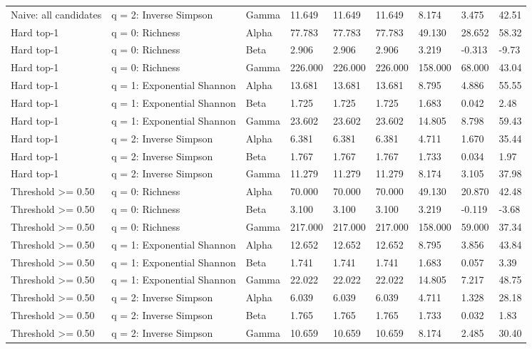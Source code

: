 \begin{landscape}
\begin{longtable}{L{3.4cm}L{2.5cm}L{1.6cm}*{6}{C{1.55cm}}}
Naive: all candidates & q = 2: Inverse Simpson & Gamma & 11.649 & 11.649 & 11.649 & 8.174 & 3.475 & 42.51 \\
Hard top-1 & q = 0: Richness & Alpha & 77.783 & 77.783 & 77.783 & 49.130 & 28.652 & 58.32 \\
Hard top-1 & q = 0: Richness & Beta & 2.906 & 2.906 & 2.906 & 3.219 & -0.313 & -9.73 \\
Hard top-1 & q = 0: Richness & Gamma & 226.000 & 226.000 & 226.000 & 158.000 & 68.000 & 43.04 \\
Hard top-1 & q = 1: Exponential Shannon & Alpha & 13.681 & 13.681 & 13.681 & 8.795 & 4.886 & 55.55 \\
Hard top-1 & q = 1: Exponential Shannon & Beta & 1.725 & 1.725 & 1.725 & 1.683 & 0.042 & 2.48 \\
Hard top-1 & q = 1: Exponential Shannon & Gamma & 23.602 & 23.602 & 23.602 & 14.805 & 8.798 & 59.43 \\
Hard top-1 & q = 2: Inverse Simpson & Alpha & 6.381 & 6.381 & 6.381 & 4.711 & 1.670 & 35.44 \\
Hard top-1 & q = 2: Inverse Simpson & Beta & 1.767 & 1.767 & 1.767 & 1.733 & 0.034 & 1.97 \\
Hard top-1 & q = 2: Inverse Simpson & Gamma & 11.279 & 11.279 & 11.279 & 8.174 & 3.105 & 37.98 \\
Threshold >= 0.50 & q = 0: Richness & Alpha & 70.000 & 70.000 & 70.000 & 49.130 & 20.870 & 42.48 \\
Threshold >= 0.50 & q = 0: Richness & Beta & 3.100 & 3.100 & 3.100 & 3.219 & -0.119 & -3.68 \\
Threshold >= 0.50 & q = 0: Richness & Gamma & 217.000 & 217.000 & 217.000 & 158.000 & 59.000 & 37.34 \\
Threshold >= 0.50 & q = 1: Exponential Shannon & Alpha & 12.652 & 12.652 & 12.652 & 8.795 & 3.856 & 43.84 \\
Threshold >= 0.50 & q = 1: Exponential Shannon & Beta & 1.741 & 1.741 & 1.741 & 1.683 & 0.057 & 3.39 \\
Threshold >= 0.50 & q = 1: Exponential Shannon & Gamma & 22.022 & 22.022 & 22.022 & 14.805 & 7.217 & 48.75 \\
Threshold >= 0.50 & q = 2: Inverse Simpson & Alpha & 6.039 & 6.039 & 6.039 & 4.711 & 1.328 & 28.18 \\
Threshold >= 0.50 & q = 2: Inverse Simpson & Beta & 1.765 & 1.765 & 1.765 & 1.733 & 0.032 & 1.83 \\
Threshold >= 0.50 & q = 2: Inverse Simpson & Gamma & 10.659 & 10.659 & 10.659 & 8.174 & 2.485 & 30.40 \\

\end{longtable}
\end{landscape}

